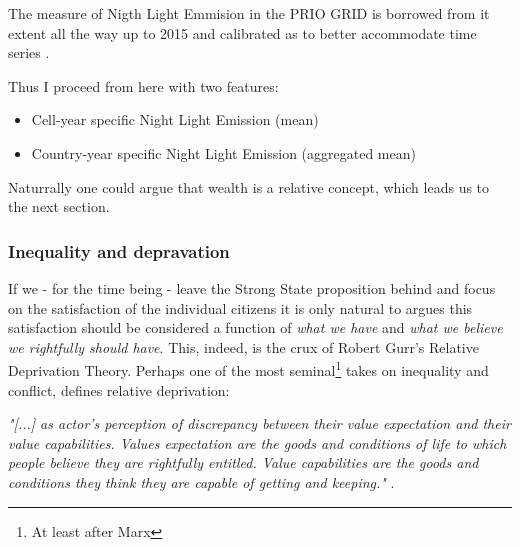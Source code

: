 \documentclass[a4paper]{article}
\begin{document}
 The measure of Nigth Light Emmision in the PRIO GRID is borrowed from \cite{Elvidge_2014}it extent all the way up to 2015 and calibrated as to better accommodate time series \cite{prio_code_2015}.\par %
 
 Thus I proceed from here with two features:
 
 \begin{itemize}
     \item Cell-year specific Night Light Emission (mean)
     \item Country-year specific Night Light Emission (aggregated mean) 
 \end{itemize}

Naturrally one could argue that wealth is a relative concept, which leads us to the next section.

\subsubsection{Inequality and depravation} %

If we - for the time being - leave the Strong State proposition behind and focus on the satisfaction of the individual citizens it is only natural to argues this satisfaction should be considered a function of \emph{what we have} and \emph{what we believe we rightfully should have}. This, indeed, is the crux of Robert Gurr's \citeyearpar{Gurr_1970} Relative Deprivation Theory. Perhaps one of the most seminal\footnote{At least after Marx} takes on inequality and conflict, \cite{Gurr_1970} defines relative deprivation: 

\begin{displayquote}
\emph{"[...] as actor's perception of discrepancy between their value expectation and their value capabilities. Values expectation are the goods and conditions of life to which people believe they are rightfully entitled. Value capabilities are the goods and conditions they think they are capable of getting and keeping."} \citep[24]{Gurr_1970}. 
\end{displayquote}
\end{document}
